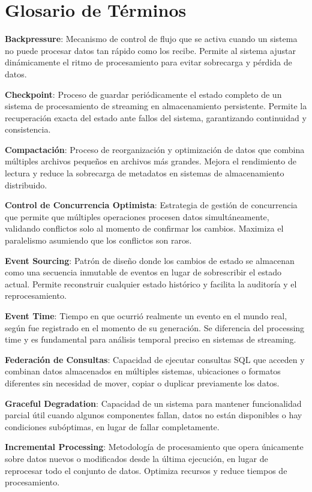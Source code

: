 \section{Glosario de Términos}

\textbf{Backpressure}: Mecanismo de control de flujo que se activa cuando un sistema no puede procesar datos tan rápido como los recibe. Permite al sistema ajustar dinámicamente el ritmo de procesamiento para evitar sobrecarga y pérdida de datos.

\textbf{Checkpoint}: Proceso de guardar periódicamente el estado completo de un sistema de procesamiento de streaming en almacenamiento persistente. Permite la recuperación exacta del estado ante fallos del sistema, garantizando continuidad y consistencia.

\textbf{Compactación}: Proceso de reorganización y optimización de datos que combina múltiples archivos pequeños en archivos más grandes. Mejora el rendimiento de lectura y reduce la sobrecarga de metadatos en sistemas de almacenamiento distribuido.

\textbf{Control de Concurrencia Optimista}: Estrategia de gestión de concurrencia que permite que múltiples operaciones procesen datos simultáneamente, validando conflictos solo al momento de confirmar los cambios. Maximiza el paralelismo asumiendo que los conflictos son raros.

\textbf{Event Sourcing}: Patrón de diseño donde los cambios de estado se almacenan como una secuencia inmutable de eventos en lugar de sobrescribir el estado actual. Permite reconstruir cualquier estado histórico y facilita la auditoría y el reprocesamiento.

\textbf{Event Time}: Tiempo en que ocurrió realmente un evento en el mundo real, según fue registrado en el momento de su generación. Se diferencia del processing time y es fundamental para análisis temporal preciso en sistemas de streaming.

\textbf{Federación de Consultas}: Capacidad de ejecutar consultas SQL que acceden y combinan datos almacenados en múltiples sistemas, ubicaciones o formatos diferentes sin necesidad de mover, copiar o duplicar previamente los datos.

\textbf{Graceful Degradation}: Capacidad de un sistema para mantener funcionalidad parcial útil cuando algunos componentes fallan, datos no están disponibles o hay condiciones subóptimas, en lugar de fallar completamente.

\textbf{Incremental Processing}: Metodología de procesamiento que opera únicamente sobre datos nuevos o modificados desde la última ejecución, en lugar de reprocesar todo el conjunto de datos. Optimiza recursos y reduce tiempos de procesamiento.

